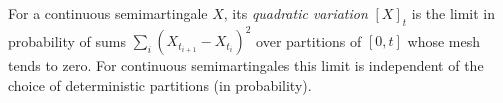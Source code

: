 
For a continuous semimartingale $X$, its \emph{quadratic variation} $[X]_t$ is the limit in probability of sums $\sum_i(X_{t_{i+1}}-X_{t_i})^2$ over partitions of $[0,t]$ whose mesh tends to zero. For continuous semimartingales this limit is independent of the choice of deterministic partitions (in probability).
